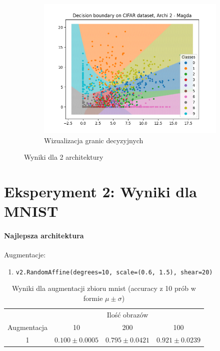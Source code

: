 \documentclass[10pt]{article}
\begin{document}
\begin{figure}[H]
\begin{subfigure}[b]{.19\textwidth}
        \includegraphics[width=\linewidth]{img/magda/Cifar_small_decision}
        \caption{Wizualizacja granic decyzyjnych}
    \end{subfigure}
    \caption{Wyniki dla 2 architektury}\label{fig:exp1_magda_cifar2}
\end{figure}

\pagebreak
\section{Eksperyment 2: Wyniki dla MNIST}\label{sec:ex2_mnist}

\paragraph{Najlepsza architektura}

Augmentacje:
\begin{enumerate}
    \item \texttt{v2.RandomAffine(degrees=10, scale=(0.6, 1.5), shear=20)}
\end{enumerate}

\begin{table}[H]\centering
    \begin{tabular}{cccc}
        \toprule
                    & \multicolumn{3}{c}{Ilość obrazów}                                            \\ \cmidrule{2-4}
        Augmentacja & 10                                & 200                 & 100                \\ \midrule
        1           & $0.100 \pm 0.0005 $               & $0.795 \pm 0.0421 $ & $0.921 \pm 0.0239$ \\
        \bottomrule
    \end{tabular}
    \caption{Wyniki dla augmentacji zbioru mnist (accuracy z 10 prób w formie $\mu \pm \sigma$)}
\end{table}
\end{document}

